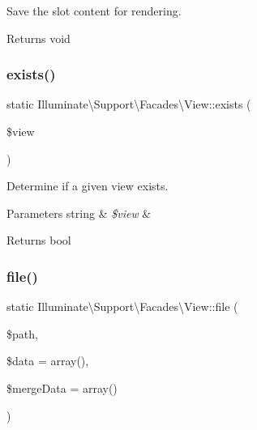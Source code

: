 Save the slot content for rendering.

\begin{DoxyReturn}{Returns}
void 
\end{DoxyReturn}
\mbox{\label{class_illuminate_1_1_support_1_1_facades_1_1_view_a8b17ded592f4c70188c7cf5849be67e1}} 
\subsubsection{\texorpdfstring{exists()}{exists()}}
{\footnotesize\ttfamily static Illuminate\textbackslash{}\+Support\textbackslash{}\+Facades\textbackslash{}\+View\+::exists (\begin{DoxyParamCaption}\item[{}]{\$view }\end{DoxyParamCaption})\hspace{0.3cm}{\ttfamily [static]}}

Determine if a given view exists.


\begin{DoxyParams}[1]{Parameters}
string & {\em \$view} & \\
\hline
\end{DoxyParams}
\begin{DoxyReturn}{Returns}
bool 
\end{DoxyReturn}
\mbox{\label{class_illuminate_1_1_support_1_1_facades_1_1_view_a0575e6c6bf99f4006b7104bd09e75327}} 
\subsubsection{\texorpdfstring{file()}{file()}}
{\footnotesize\ttfamily static Illuminate\textbackslash{}\+Support\textbackslash{}\+Facades\textbackslash{}\+View\+::file (\begin{DoxyParamCaption}\item[{}]{\$path,  }\item[{}]{\$data = {\ttfamily array()},  }\item[{}]{\$merge\+Data = {\ttfamily array()} }\end{DoxyParamCaption})\hspace{0.3cm}{\ttfamily [static]}}

